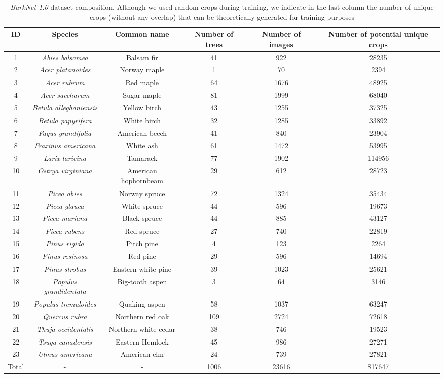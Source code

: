 \documentclass[letterpaper, 10 pt, conference]{ieeeconf}  %
\begin{document}
\begin{table*}[t]
\begin{center}
\begin{tabular}{| c | c | c | c | c | c |}
\hline
ID & Species & Common name & Number of trees & Number of images & Number of potential unique crops \\
\hline
1 & \emph{Abies balsamea} & Balsam fir & 41 & 922 & 28235\\
2 & \emph{Acer platanoides} & Norway maple & 1 & 70 & 2394\\
3 & \emph{Acer rubrum} & Red maple & 64 & 1676 & 48925\\
4 & \emph{Acer saccharum} & Sugar maple & 81 & 1999 & 68040\\
5 & \emph{Betula alleghaniensis} & Yellow birch & 43 & 1255 & 37325\\
6 & \emph{Betula papyrifera} & White birch  & 32 & 1285 & 33892\\
7 & \emph{Fagus grandifolia} & American beech & 41 & 840 & 23904\\
8 & \emph{Fraxinus americana} & White ash & 61 & 1472 & 53995\\
9 & \emph{Larix laricina} & Tamarack & 77 & 1902 & 114956\\
10 & \emph{Ostrya virginiana} & American hophornbeam & 29 & 612 & 28723\\
11 & \emph{Picea abies} & Norway spruce & 72 & 1324 & 35434\\
12 & \emph{Picea glauca} & White spruce & 44 & 596 & 19673\\
13 & \emph{Picea mariana} & Black spruce & 44 & 885 & 43127\\
14 & \emph{Picea rubens} & Red spruce & 27 & 740 & 22819\\
15 & \emph{Pinus rigida} & Pitch pine & 4 & 123 & 2264\\
16 & \emph{Pinus resinosa} & Red pine & 29 & 596 & 14694\\
17 & \emph{Pinus strobus} & Eastern white pine & 39 & 1023 & 25621\\
18 & \emph{Populus grandidentata} & Big-tooth aspen & 3 & 64 & 3146\\
19 & \emph{Populus tremuloides} & Quaking aspen & 58 & 1037 & 63247\\
20 & \emph{Quercus rubra} & Northern red oak & 109 & 2724 & 72618\\
21 & \emph{Thuja occidentalis} & Northern white cedar & 38 & 746 & 19523\\
22 & \emph{Tsuga canadensis} & Eastern Hemlock & 45 & 986 & 27271\\
23 & \emph{Ulmus americana} & American elm & 24 & 739 & 27821\\
\hline
Total & - & - & 1006 & 23616 & 817647\\
\hline
\end{tabular}
\end{center}
\caption{\emph{BarkNet 1.0} dataset composition. Although we used random crops during training, we indicate in the last column the number of unique crops (without any overlap) that can be theoretically generated for training purposes}
\label{table:our_dataset}
\end{table*}
\end{document}
